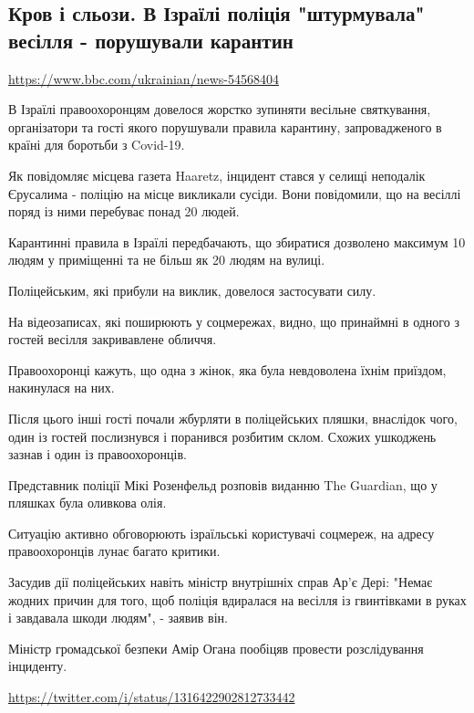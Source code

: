  
 

\subsection{Кров і сльози. В Ізраїлі поліція "штурмувала" весілля - порушували карантин}
\label{sec:16_10_2020.news.ua.bbc.1_izrael_covid_marriage}

\url{https://www.bbc.com/ukrainian/news-54568404}

В Ізраїлі правоохоронцям довелося жорстко зупиняти весільне святкування,
організатори та гості якого порушували правила карантину, запровадженого в
країні для боротьби з Covid-19.

Як повідомляє місцева газета Haaretz, інцидент стався у селищі неподалік
Єрусалима - поліцію на місце викликали сусіди. Вони повідомили, що на весіллі
поряд із ними перебуває понад 20 людей.

Карантинні правила в Ізраїлі передбачають, що збиратися дозволено максимум 10
людям у приміщенні та не більш як 20 людям на вулиці.

Поліцейським, які прибули на виклик, довелося застосувати силу.

На відеозаписах, які поширюють у соцмережах, видно, що принаймні в одного з
гостей весілля закривавлене обличчя.

Правоохоронці кажуть, що одна з жінок, яка була невдоволена їхнім приїздом,
накинулася на них.

Після цього інші гості почали жбурляти в поліцейських пляшки, внаслідок чого,
один із гостей послизнувся і поранився розбитим склом. Схожих ушкоджень зазнав
і один із правоохоронців.

Представник поліції Мікі Розенфельд розповів виданню The Guardian, що у пляшках
була оливкова олія.

Ситуацію активно обговорюють ізраїльські користувачі соцмереж, на адресу
правоохоронців лунає багато критики.

Засудив дії поліцейських навіть міністр внутрішніх справ Ар'є Дері: "Немає
жодних причин для того, щоб поліція вдиралася на весілля із гвинтівками в руках
і завдавала шкоди людям", - заявив він.

Міністр громадської безпеки Амір Огана пообіцяв провести розслідування
інциденту. 

\url{https://twitter.com/i/status/1316422902812733442}
